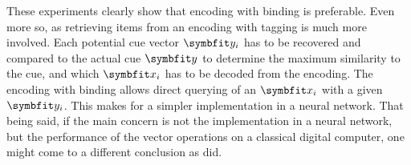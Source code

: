 These experiments clearly show that encoding with binding is preferable.
Even more so, as retrieving items from an encoding with tagging is much more involved.
Each potential cue vector $\vc y_i$ has to be recovered and compared to the actual cue $\vc y$ to determine the maximum similarity to the cue, and which $\vc x_i$ has to be decoded from the encoding.
The encoding with binding allows direct querying of an $\vc x_i$ with a given $\vc y_i$.
This makes for a simpler implementation in a neural network.
That being said, if the main concern is not the implementation in a neural network, but the performance of the vector operations on a classical digital computer, one might come to a different conclusion as \textcite{recchia2015} did.
